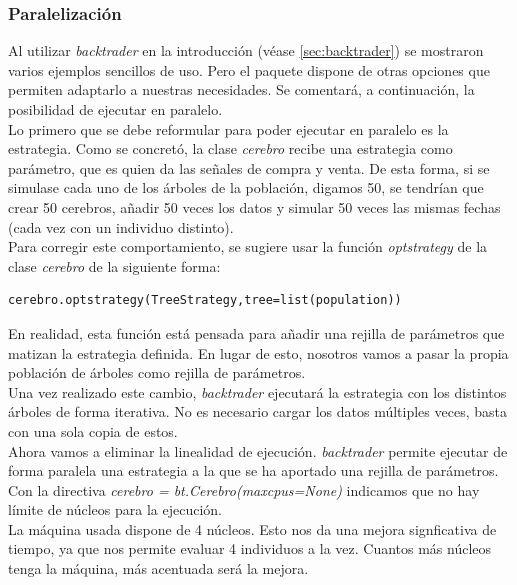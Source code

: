 \subsubsection{Paralelizaci\'on}
Al utilizar \textit{backtrader} en la introducci\'on (v\'ease \ref{sec:backtrader}) se mostraron varios ejemplos sencillos de uso. Pero el paquete dispone de otras opciones que permiten adaptarlo a nuestras necesidades. Se comentar\'a, a continuaci\'on, la posibilidad de ejecutar en paralelo.\\

Lo primero que se debe reformular para poder ejecutar en paralelo es la estrategia. Como se concret\'o, la clase \textit{cerebro} recibe una estrategia como par\'ametro, que es quien da las se\~nales de compra y venta. De esta forma, si se simulase cada uno de los \'arboles de la poblaci\'on, digamos 50, se tendr\'ian que crear 50 cerebros, a\~nadir 50 veces los datos y simular 50 veces las mismas fechas (cada vez con un individuo distinto).\\

Para corregir este comportamiento, se sugiere usar la funci\'on \textit{optstrategy} de la clase \textit{cerebro} de la siguiente forma:\\

\begin{lstlisting}
cerebro.optstrategy(TreeStrategy,tree=list(population))
\end{lstlisting}

En realidad, esta funci\'on est\'a pensada para a\~nadir una rejilla de par\'ametros que matizan la estrategia definida. En lugar de esto, nosotros vamos a pasar la propia poblaci\'on de \'arboles como rejilla de par\'ametros.\\

Una vez realizado este cambio, \textit{backtrader} ejecutar\'a la estrategia con los distintos \'arboles de forma iterativa. No es necesario cargar los datos m\'ultiples veces, basta con una sola copia de estos.\\

Ahora vamos a eliminar la linealidad de ejecuci\'on. \textit{backtrader} permite ejecutar de forma paralela una estrategia a la que se ha aportado una rejilla de par\'ametros. Con la directiva \textit{cerebro = bt.Cerebro(maxcpus=None)} indicamos que no hay l\'imite de n\'ucleos para la ejecuci\'on. \\

La m\'aquina usada dispone de 4 n\'ucleos. Esto nos da una mejora signficativa de tiempo, ya que nos permite evaluar 4 individuos a la vez. Cuantos m\'as n\'ucleos tenga la m\'aquina, m\'as acentuada ser\'a la mejora.\\


